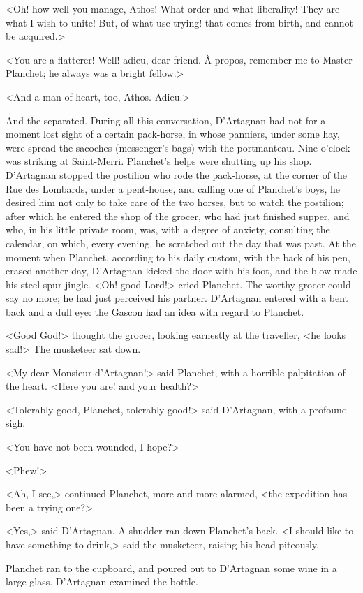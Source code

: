 <Oh! how well you manage, Athos! What order and what liberality! They are what I wish to unite! But, of what use trying! that comes from birth, and cannot be acquired.>

<You are a flatterer! Well! adieu, dear friend. À propos, remember me to Master Planchet; he always was a bright fellow.>

<And a man of heart, too, Athos. Adieu.>

And the separated. During all this conversation, D'Artagnan had not for a moment lost sight of a certain pack-horse, in whose panniers, under some hay, were spread the sacoches (messenger's bags) with the portmanteau. Nine o'clock was striking at Saint-Merri. Planchet's helps were shutting up his shop. D'Artagnan stopped the postilion who rode the pack-horse, at the corner of the Rue des Lombards, under a pent-house, and calling one of Planchet's boys, he desired him not only to take care of the two horses, but to watch the postilion; after which he entered the shop of the grocer, who had just finished supper, and who, in his little private room, was, with a degree of anxiety, consulting the calendar, on which, every evening, he scratched out the day that was past. At the moment when Planchet, according to his daily custom, with the back of his pen, erased another day, D'Artagnan kicked the door with his foot, and the blow made his steel spur jingle. <Oh! good Lord!> cried Planchet. The worthy grocer could say no more; he had just perceived his partner. D'Artagnan entered with a bent back and a dull eye: the Gascon had an idea with regard to Planchet.

<Good God!> thought the grocer, looking earnestly at the traveller, <he looks sad!> The musketeer sat down.

<My dear Monsieur d'Artagnan!> said Planchet, with a horrible palpitation of the heart. <Here you are! and your health?>

<Tolerably good, Planchet, tolerably good!> said D'Artagnan, with a profound sigh.

<You have not been wounded, I hope?>

<Phew!>

<Ah, I see,> continued Planchet, more and more alarmed, <the expedition has been a trying one?>

<Yes,> said D'Artagnan. A shudder ran down Planchet's back. <I should like to have something to drink,> said the musketeer, raising his head piteously.

Planchet ran to the cupboard, and poured out to D'Artagnan some wine in a large glass. D'Artagnan examined the bottle.

